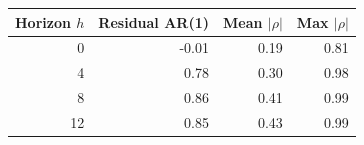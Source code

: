 \begin{tabular}{r r r r}
\toprule
Horizon $h$ & Residual AR(1) & Mean $|\rho|$ & Max $|\rho|$ \\
\midrule
0 & -0.01 & 0.19 & 0.81 \\
4 & 0.78 & 0.30 & 0.98 \\
8 & 0.86 & 0.41 & 0.99 \\
12 & 0.85 & 0.43 & 0.99 \\
\bottomrule
\end{tabular}
